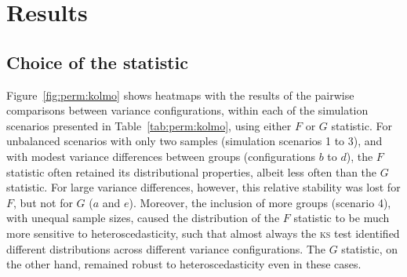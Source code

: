 \section{Results}

\subsection{Choice of the statistic}
\label{sec:perm:results_statistic}

Figure~\ref{fig:perm:kolmo} shows heatmaps with the results of the pairwise comparisons between variance configurations, within each of the simulation scenarios presented in Table~\ref{tab:perm:kolmo}, using either $F$ or $G$ statistic. For unbalanced scenarios with only two samples (simulation scenarios 1 to 3), and with modest variance differences between groups (configurations $b$ to $d$), the $F$ statistic often retained its distributional properties, albeit less often than the $G$ statistic. For large variance differences, however, this relative stability was lost for $F$, but not for $G$ ($a$ and $e$). Moreover, the inclusion of more groups (scenario 4), with unequal sample sizes, caused the distribution of the $F$ statistic to be much more sensitive to heteroscedasticity, such that almost always the \textsc{ks} test identified different distributions across different variance configurations. The $G$ statistic, on the other hand, remained robust to heteroscedasticity even in these cases.

